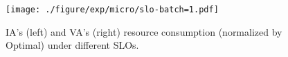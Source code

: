 



\begin{figure}[!t]
\centering
\texttt{[image: ./figure/exp/micro/slo-batch=1.pdf]}
\caption{IA's (left) and VA's (right) resource consumption (normalized by Optimal) under different SLOs. }
\label{fig:exp:slo}
\end{figure}

